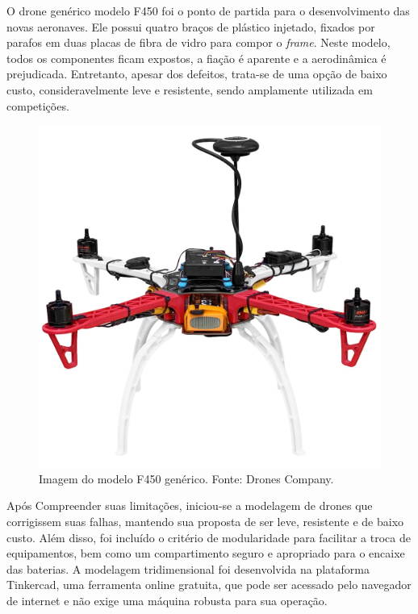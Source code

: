 \documentclass[conference]{IEEEtran}
\begin{document}
O drone genérico modelo F450 foi o ponto de partida para o desenvolvimento das novas aeronaves. Ele possui quatro braços de plástico injetado, fixados por parafos em duas placas de fibra de vidro para compor o \textit{frame}. Neste modelo, todos os componentes ficam expostos, a fiação é aparente e a aerodinâmica é prejudicada. Entretanto, apesar dos defeitos, trata-se de uma opção de baixo custo, consideravelmente leve e resistente, sendo amplamente utilizada em competições. 

\begin{figure}[!htb]
    \centering
    \includegraphics[scale=0.07]{img/f450.jpg} 
    \caption{Imagem do modelo F450 genérico. Fonte: Drones Company.}
    \label{fig:F450}
\end{figure}

Após Compreender suas limitações, iniciou-se a modelagem de drones que corrigissem suas falhas, mantendo sua proposta de ser leve, resistente e de baixo custo. Além disso, foi incluído o critério de modularidade para facilitar a troca de equipamentos, bem como um compartimento seguro e apropriado para o encaixe das baterias. A modelagem tridimensional foi desenvolvida na plataforma Tinkercad, uma ferramenta online gratuita, que pode ser acessado pelo navegador de internet e não exige uma máquina robusta para sua operação.
\end{document}
